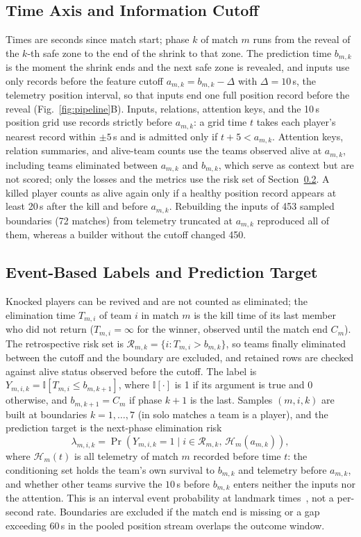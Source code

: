 \documentclass[sigconf,anonymous]{acmart}
\begin{document}
\subsection{Time Axis and Information Cutoff}
\label{sec:method:samples}
Times are seconds since match start; phase $k$ of match $m$ runs from the reveal of the $k$-th safe zone to the end of the shrink to that zone. The prediction time $b_{m,k}$ is the moment the shrink ends and the next safe zone is revealed, and inputs use only records before the feature cutoff $a_{m,k}=b_{m,k}-\Delta$ with $\Delta=10$\,s, the telemetry position interval, so that inputs end one full position record before the reveal (Fig.~\ref{fig:pipeline}B). Inputs, relations, attention keys, and the 10\,s position grid use records strictly before $a_{m,k}$: a grid time $t$ takes each player's nearest record within $\pm5$\,s and is admitted only if $t+5<a_{m,k}$. Attention keys, relation summaries, and alive-team counts use the teams observed alive at $a_{m,k}$, including teams eliminated between $a_{m,k}$ and $b_{m,k}$, which serve as context but are not scored; only the losses and the metrics use the risk set of Section~\ref{sec:method:labels}. A killed player counts as alive again only if a healthy position record appears at least 20\,s after the kill and before $a_{m,k}$. Rebuilding the inputs of 453 sampled boundaries (72 matches) from telemetry truncated at $a_{m,k}$ reproduced all of them, whereas a builder without the cutoff changed 450.

\subsection{Event-Based Labels and Prediction Target}
\label{sec:method:labels}
Knocked players can be revived and are not counted as eliminated; the elimination time $T_{m,i}$ of team $i$ in match $m$ is the kill time of its last member who did not return ($T_{m,i}=\infty$ for the winner, observed until the match end $C_m$). The retrospective risk set is $\mathcal{R}_{m,k}=\{i:T_{m,i}>b_{m,k}\}$, so teams finally eliminated between the cutoff and the boundary are excluded, and retained rows are checked against alive status observed before the cutoff. The label is $Y_{m,i,k}=\mathbb{I}[T_{m,i}\le b_{m,k+1}]$, where $\mathbb{I}[\cdot]$ is 1 if its argument is true and 0 otherwise, and $b_{m,k+1}=C_m$ if phase $k+1$ is the last. Samples $(m,i,k)$ are built at boundaries $k=1,\dots,7$ (in solo matches a team is a player), and the prediction target is the next-phase elimination risk
\begin{equation}
\lambda_{m,i,k}=\Pr\!\left(Y_{m,i,k}=1 \mid i\in\mathcal{R}_{m,k},\,\mathcal{H}_{m}(a_{m,k})\right),
\label{eq:hazard}
\end{equation}
where $\mathcal{H}_{m}(t)$ is all telemetry of match $m$ recorded before time $t$: the conditioning set holds the team's own survival to $b_{m,k}$ and telemetry before $a_{m,k}$, and whether other teams survive the $10$\,s before $b_{m,k}$ enters neither the inputs nor the attention. This is an interval event probability at landmark times~\cite{vanHouwelingen07}, not a per-second rate. Boundaries are excluded if the match end is missing or a gap exceeding 60\,s in the pooled position stream overlaps the outcome window.
\end{document}

